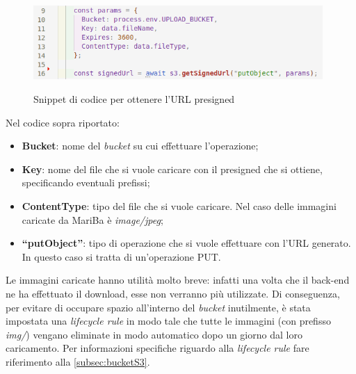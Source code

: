 	\begin{figure}[H]
		\centering
		\includegraphics[width=11cm]{immagini/getURL.png} \\
		\caption{\label{fig:getURL} Snippet di codice per ottenere l'URL presigned}
	\end{figure}
	
	Nel codice sopra riportato:
	\begin{itemize}
		\item \textbf{Bucket}: nome del \emph{bucket} su cui effettuare l'operazione;
		\item \textbf{Key}: nome del file che si vuole caricare con il presigned che si ottiene, specificando eventuali prefissi;
		\item \textbf{ContentType}: tipo del file che si vuole caricare. Nel caso delle immagini caricate da MariBa è \emph{image/jpeg};
		\item \textbf{``putObject''}: tipo di operazione che si vuole effettuare con l'URL generato. In questo caso si 
		tratta di un'operazione PUT.
	\end{itemize}
	Le immagini caricate hanno utilità molto breve: infatti una volta che il back-end ne ha effettuato il download, 
	esse non verranno più utilizzate. Di conseguenza, per evitare di occupare spazio all'interno del \emph{bucket} inutilmente, è stata impostata una \emph{lifecycle rule} in modo tale che tutte le immagini (con prefisso \emph{img/}) vengano eliminate in modo automatico dopo un giorno dal loro caricamento.
	Per informazioni specifiche riguardo alla \emph{lifecycle rule} fare riferimento alla \autoref{subsec:bucketS3}.
	
